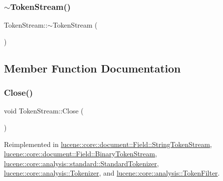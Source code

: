 \subsubsection{\texorpdfstring{$\sim$\+Token\+Stream()}{~TokenStream()}}
{\footnotesize\ttfamily Token\+Stream\+::$\sim$\+Token\+Stream (\begin{DoxyParamCaption}{ }\end{DoxyParamCaption})\hspace{0.3cm}{\ttfamily [virtual]}}



\subsection{Member Function Documentation}
\mbox{\label{classlucene_1_1core_1_1analysis_1_1TokenStream_ad7963391ddbb2c75610e3738ba5155c8}} 
\subsubsection{\texorpdfstring{Close()}{Close()}}
{\footnotesize\ttfamily void Token\+Stream\+::\+Close (\begin{DoxyParamCaption}{ }\end{DoxyParamCaption})\hspace{0.3cm}{\ttfamily [virtual]}}



Reimplemented in \mbox{\hyperlink{classlucene_1_1core_1_1document_1_1Field_1_1StringTokenStream_a1852abe05943aaf330ef776fc783f472}{lucene\+::core\+::document\+::\+Field\+::\+String\+Token\+Stream}}, \mbox{\hyperlink{classlucene_1_1core_1_1document_1_1Field_1_1BinaryTokenStream_a40c73dd8eae9ab36e7e8f9e859a037ae}{lucene\+::core\+::document\+::\+Field\+::\+Binary\+Token\+Stream}}, \mbox{\hyperlink{classlucene_1_1core_1_1analysis_1_1standard_1_1StandardTokenizer_a108793659fb18bdd695e0c2be91ba730}{lucene\+::core\+::analysis\+::standard\+::\+Standard\+Tokenizer}}, \mbox{\hyperlink{classlucene_1_1core_1_1analysis_1_1Tokenizer_a95c3c0e37e3276be69fa0992b0e45e94}{lucene\+::core\+::analysis\+::\+Tokenizer}}, and \mbox{\hyperlink{classlucene_1_1core_1_1analysis_1_1TokenFilter_a4b991b01385423b87b5714061e4326c8}{lucene\+::core\+::analysis\+::\+Token\+Filter}}.

